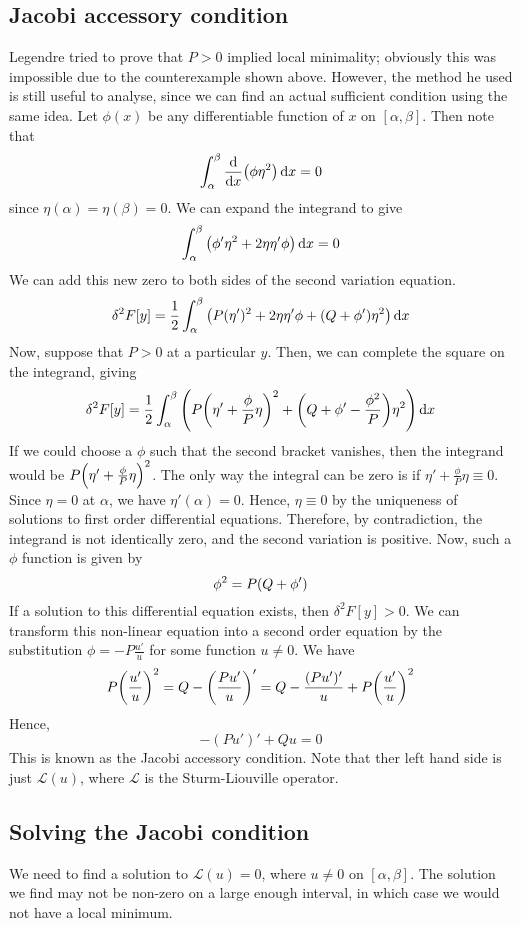 \subsection{Jacobi accessory condition}
Legendre tried to prove that \( P > 0 \) implied local minimality; obviously this was impossible due to the counterexample shown above.
However, the method he used is still useful to analyse, since we can find an actual sufficient condition using the same idea.
Let \( \phi(x) \) be any differentiable function of \( x \) on \( [\alpha, \beta] \).
Then note that
\[
	\int_\alpha^\beta \dv{x} \qty( \phi \eta^2 ) \dd{x} = 0
\]
since \( \eta(\alpha) = \eta(\beta) = 0 \).
We can expand the integrand to give
\[
	\int_\alpha^\beta \qty( \phi' \eta^2 + 2 \eta \eta' \phi ) \dd{x} = 0
\]
We can add this new zero to both sides of the second variation equation.
\[
	\delta^2 F[y] = \frac{1}{2} \int_\alpha^\beta \qty( P(\eta')^2 + 2 \eta \eta' \phi + \qty(Q + \phi') \eta^2 ) \dd{x}
\]
Now, suppose that \( P > 0 \) at a particular \( y \).
Then, we can complete the square on the integrand, giving
\[
	\delta^2 F[y] = \frac{1}{2} \int_\alpha^\beta \qty( P\qty(\eta' + \frac{\phi}{P} \eta)^2 + \qty(Q + \phi' - \frac{\phi^2}{P}) \eta^2 ) \dd{x}
\]
If we could choose a \( \phi \) such that the second bracket vanishes, then the integrand would be \( P\qty(\eta' + \frac{\phi}{P} \eta)^2 \).
The only way the integral can be zero is if \( \eta' + \frac{\phi}{P} \eta \equiv 0 \).
Since \( \eta = 0 \) at \( \alpha \), we have \( \eta'(\alpha) = 0 \).
Hence, \( \eta \equiv 0 \) by the uniqueness of solutions to first order differential equations.
Therefore, by contradiction, the integrand is not identically zero, and the second variation is positive.
Now, such a \( \phi \) function is given by
\[
	\phi^2 = P\qty(Q + \phi')
\]
If a solution to this differential equation exists, then \( \delta^2 F[y] > 0 \).
We can transform this non-linear equation into a second order equation by the substitution \( \phi = -P \frac{u'}{u} \) for some function \( u \neq 0 \).
We have
\[
	P \qty(\frac{u'}{u})^2 = Q - \qty(\frac{Pu'}{u})' = Q - \frac{(Pu')'}{u} + P \qty(\frac{u'}{u})^2
\]
Hence,
\[
	-(Pu')' + Qu = 0
\]
This is known as the Jacobi accessory condition.
Note that ther left hand side is just \( \mathcal L(u) \), where \( \mathcal L \) is the Sturm-Liouville operator.

\subsection{Solving the Jacobi condition}
We need to find a solution to \( \mathcal L(u) = 0 \), where \( u \neq 0 \) on \( [\alpha, \beta] \).
The solution we find may not be non-zero on a large enough interval, in which case we would not have a local minimum.

